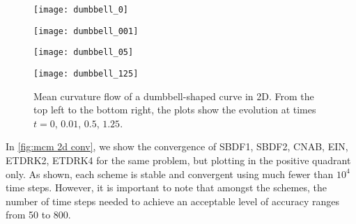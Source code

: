 \begin{figure}[htb!]
        \centering
\begin{minipage}{0.48\textwidth}
        \texttt{[image: dumbbell\_0]}
\end{minipage}%
\begin{minipage}{0.48\textwidth}
        \texttt{[image: dumbbell\_001]}
\end{minipage}
\begin{minipage}{0.48\textwidth}
        \texttt{[image: dumbbell\_05]}
\end{minipage}%
\begin{minipage}{0.48\textwidth}
        \texttt{[image: dumbbell\_125]}
\end{minipage}%
\caption[Mean curvature flow of a dumbbell-shaped curve in 2D.]{Mean curvature flow of a dumbbell-shaped curve in 2D. From the top left to the bottom right, the plots show the evolution at times $t=0$, $0.01$, $0.5$, $1.25$.}
\label{fig:mcm 2d dumbbell}
\end{figure}

In \cref{fig:mcm 2d conv}, we show the convergence of SBDF1, SBDF2, CNAB, EIN, ETDRK2, ETDRK4 for the same problem, but plotting in the positive quadrant only. As shown, each scheme is stable and convergent using much fewer than $10^4$ time steps. However, it is important to note that amongst the schemes, the number of time steps needed to achieve an acceptable level of accuracy ranges from 50 to 800. 

